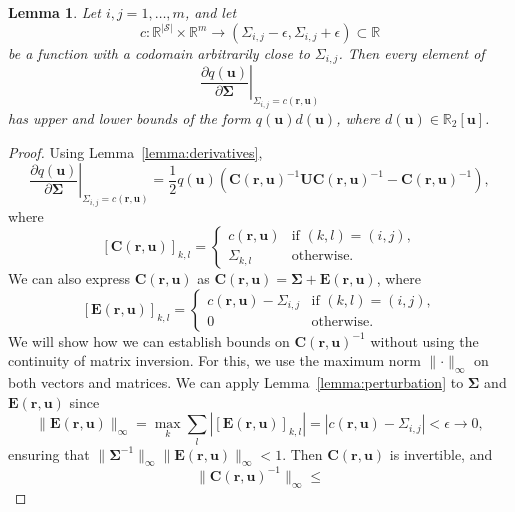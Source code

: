 \documentclass{mpaper}
\newtheorem{lemma}[theorem]{Lemma}
\begin{document}
\begin{lemma} \label{lemma:bound3}
  Let $i, j = 1, \dots, m$, and let
  \[
    c : \mathbb{R}^{|\mathcal{S}|} \times \mathbb{R}^m \to (\Sigma_{i,j} - \epsilon,
    \Sigma_{i,j} + \epsilon) \subset \mathbb{R}
  \]
  be a function with a codomain arbitrarily close to $\Sigma_{i,j}$. Then every
  element of
  \[
    \left. \frac{\partial q(\mathbf{u})}{\partial \bm\Sigma} \right|_{\Sigma_{i,j} =
    c(\mathbf{r}, \mathbf{u})}
  \]
  has upper and lower bounds of the form $q(\mathbf{u})d(\mathbf{u})$, where
  $d(\mathbf{u}) \in \mathbb{R}_2[\mathbf{u}]$.
\end{lemma}
\begin{proof}
  Using Lemma~\ref{lemma:derivatives},
  \[
    \left. \frac{\partial q(\mathbf{u})}{\partial \bm\Sigma} \right|_{\Sigma_{i,j} =
    c(\mathbf{r}, \mathbf{u})} =
    \frac{1}{2}q(\mathbf{u})(\mathbf{C}(\mathbf{r},
    \mathbf{u})^{-1}\mathbf{UC}(\mathbf{r}, \mathbf{u})^{-1} -
    \mathbf{C}(\mathbf{r}, \mathbf{u})^{-1}),
  \]
  where
  \[
    [\mathbf{C}(\mathbf{r}, \mathbf{u})]_{k,l} =
    \begin{cases}
      c(\mathbf{r}, \mathbf{u}) & \text{if } (k, l) = (i, j), \\
      \Sigma_{k,l} & \text{otherwise.}
    \end{cases}
  \]
  We can also express $\mathbf{C}(\mathbf{r},\mathbf{u})$ as
  $\mathbf{C}(\mathbf{r}, \mathbf{u}) = \bm\Sigma + \mathbf{E}(\mathbf{r},
  \mathbf{u})$, where
  \[
    [\mathbf{E}(\mathbf{r}, \mathbf{u})]_{k,l} =
    \begin{cases}
      c(\mathbf{r}, \mathbf{u}) - \Sigma_{i,j} & \text{if } (k, l) = (i, j), \\
      0 & \text{otherwise.}
    \end{cases}
  \]
  We will show how we can establish bounds on $\mathbf{C}(\mathbf{r},
  \mathbf{u})^{-1}$ without using the continuity of matrix inversion. For this,
  we use the maximum norm $\lVert \cdot \rVert_\infty$ on both vectors and
  matrices. We can apply Lemma~\ref{lemma:perturbation} to $\bm\Sigma$ and
  $\mathbf{E}(\mathbf{r}, \mathbf{u})$ since
  \[
    \lVert \mathbf{E}(\mathbf{r}, \mathbf{u}) \rVert_\infty = \max_k \sum_l
    |[\mathbf{E}(\mathbf{r}, \mathbf{u})]_{k,l}| = |c(\mathbf{r}, \mathbf{u}) -
    \Sigma_{i,j}| < \epsilon \to 0,
  \]
  ensuring that $\lVert \bm\Sigma^{-1} \rVert_\infty
  \lVert \mathbf{E}(\mathbf{r}, \mathbf{u}) \rVert_\infty < 1$. Then
  $\mathbf{C}(\mathbf{r}, \mathbf{u})$ is invertible, and
  \[
    \lVert \mathbf{C}(\mathbf{r}, \mathbf{u})^{-1} \rVert_\infty \le
\]
\end{proof}
\end{document}
